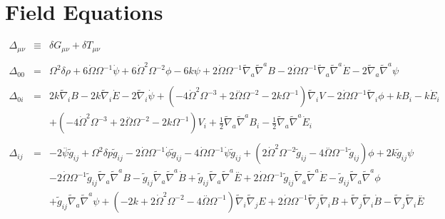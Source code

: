 \documentclass[10pt,letterpaper]{article}
\numberwithin{equation}{section}
\begin{document}
\section{Field Equations}
\begin{eqnarray}
\Delta_{\mu\nu}&\equiv&\delta G_{\mu\nu} + \delta T_{\mu\nu}
\\ \nonumber\\
\Delta_{00}&=& \Omega^2 \delta \rho + 6 \dot{\Omega} \Omega^{-1} \dot{\psi} + 6 \dot{\Omega}^2 \Omega^{-2} \phi - 6 k \psi + 2 \dot{\Omega} \Omega^{-1} \tilde{\nabla}_{a}\tilde{\nabla}^{a}B - 2 \dot{\Omega} \Omega^{-1} \tilde{\nabla}_{a}\tilde{\nabla}^{a}\dot{E} - 2 \tilde{\nabla}_{a}\tilde{\nabla}^{a}\psi 
\\  \nonumber\\ 
\Delta_{0i}&=& 2 k \tilde{\nabla}_{i}B - 2 k \tilde{\nabla}_{i}\dot{E} - 2 \tilde{\nabla}_{i}\dot{\psi} + (-4 \dot{\Omega}^2 \Omega^{-3} + 2 \overset{..}{\Omega} \Omega^{-2} - 2 k \Omega^{-1}) \tilde{\nabla}_{i}V - 2 \dot{\Omega} \Omega^{-1} \tilde{\nabla}_{i}\phi +k B_{i} -  k \dot{E}_{i} \nonumber \\ 
&& + (-4 \dot{\Omega}^2 \Omega^{-3} + 2 \overset{..}{\Omega} \Omega^{-2} - 2 k \Omega^{-1}) V_{i} + \tfrac{1}{2} \tilde{\nabla}_{a}\tilde{\nabla}^{a}B_{i} -  \tfrac{1}{2} \tilde{\nabla}_{a}\tilde{\nabla}^{a}\dot{E}_{i}
\\  \nonumber\\ 
\Delta_{ij}&=& -2 \overset{..}{\psi} \tilde{g}_{ij} + \Omega^2 \delta p \tilde{g}_{ij} - 2 \dot{\Omega} \Omega^{-1} \dot{\phi} \tilde{g}_{ij} - 4 \dot{\Omega} \Omega^{-1} \dot{\psi} \tilde{g}_{ij} + (2 \dot{\Omega}^2 \Omega^{-2} \tilde{g}_{ij} - 4 \overset{..}{\Omega} \Omega^{-1} \tilde{g}_{ij}) \phi + 2 k \tilde{g}_{ij} \psi \nonumber \\ 
&& - 2 \dot{\Omega} \Omega^{-1} \tilde{g}_{ij} \tilde{\nabla}_{a}\tilde{\nabla}^{a}B -  \tilde{g}_{ij} \tilde{\nabla}_{a}\tilde{\nabla}^{a}\dot{B} + \tilde{g}_{ij} \tilde{\nabla}_{a}\tilde{\nabla}^{a}\overset{..}{E} + 2 \dot{\Omega} \Omega^{-1} \tilde{g}_{ij} \tilde{\nabla}_{a}\tilde{\nabla}^{a}\dot{E} -  \tilde{g}_{ij} \tilde{\nabla}_{a}\tilde{\nabla}^{a}\phi \nonumber \\ 
&& + \tilde{g}_{ij} \tilde{\nabla}_{a}\tilde{\nabla}^{a}\psi + (-2 k + 2 \dot{\Omega}^2 \Omega^{-2} - 4 \overset{..}{\Omega} \Omega^{-1}) \tilde{\nabla}_{i}\tilde{\nabla}_{j}E + 2 \dot{\Omega} \Omega^{-1} \tilde{\nabla}_{j}\tilde{\nabla}_{i}B + \tilde{\nabla}_{j}\tilde{\nabla}_{i}\dot{B} -  \tilde{\nabla}_{j}\tilde{\nabla}_{i}\overset{..}{E} \nonumber \\ 

\end{eqnarray}
\end{document}
